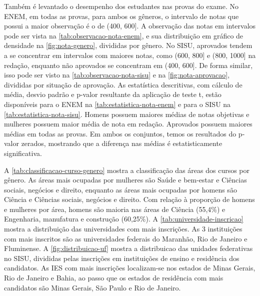 Também é levantado o desempenho dos estudantes nas provas do exame. No ENEM, em todas as provas, para ambos os gêneros, o intervalo de notas que possui a maior observação é o de (400, 600]. A observação das notas em intervalos pode ser vista na \autoref{tab:observacao-nota-enem}, e sua distribuição em gráfico de densidade na \autoref{fig:nota-genero}, divididas por gênero. No SISU, aprovados tendem a se concentrar em intervalos com maiores notas, como (600, 800] e (800, 1000] na redação, enquanto não aprovados se concentram em (400, 600]. De forma similar, isso pode ser visto na \autoref{tab:observacao-nota-sisu} e na \autoref{fig:nota-aprovacao}, divididas por situação de aprovação. As estatística descritivas, com cálculo de média, desvio padrão e p-valor resultante da aplicação de teste t, estão disponíveis para o ENEM na \autoref{tab:estatistica-nota-enem} e para o SISU na \autoref{tab:estatistica-nota-sisu}. Homens possuem maiores médias de notas objetivas e mulheres possuem maior média de nota em redação. Aprovados possuem maiores médias em todas as provas. Em ambos os conjuntos, temos os resultados do p-valor zerados, mostrando que a diferença nas médias é estatisticamente significativa.

A \autoref{tab:classificacao-curso-genero} mostra a classificação das áreas dos cursos por gênero. As áreas mais ocupadas por mulheres são Saúde e bem-estar e Ciências sociais, negócios e direito, enquanto as áreas mais ocupadas por homens são Ciência e Ciências sociais, negócios e direito. Com relação à proporção de homens e mulheres por área, homens são maioria nas áreas de Ciência (55,4\%) e Engenharia, manufatura e construção (60,25\%). A \autoref{tab:universidade-inscricao} mostra a distribuição das universidades com mais inscrições. As 3 instituições com mais inscritos são as universidades federais do Maranhão, Rio de Janeiro e Fluminense. A \autoref{fig:distribuicao-uf} mostra a distribuicao das unidades federativas no SISU, divididas pelas inscrições em instituições de ensino e residência dos candidatos. As IES com mais inscrições localizam-se nos estados de Minas Gerais, Rio de Janeiro e Bahia, ao passo que os estados de residência com mais candidatos são Minas Gerais, São Paulo e Rio de Janeiro. 
   
